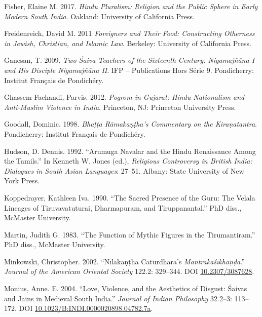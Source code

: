 \begin{hangparas}{0.125in}{1}
	\label{Fisher2017}Fisher, Elaine M. 2017. \emph{Hindu Pluralism: Religion and the Public Sphere in Early Modern South India}. Oakland: University of California Press.\medskip


	\label{Freidenreich2011}Freidenreich, David M. 2011 \emph{Foreigners and Their Food: Constructing Otherness in Jewish, Christian, and Islamic Law}. Berkeley: University of California Press.\medskip


	\label{Ganesan2009}Ganesan, T. 2009. \emph{Two Śaiva Teachers of the Sixteenth Century: Nigamajñāna I and His Disciple Nigamajñāna II}. IFP – Publications Hors Série 9. Pondicherry: Institut Français de Pondichéry. \medskip


	\label{GhassemFachandi2012}Ghassem-Fachandi, Parvis. 2012. \emph{Pogrom in Gujarat: Hindu Nationalism and Anti-Muslim Violence in India}. Princeton, NJ: Princeton University Press.\medskip


	\label{Goodall1998}Goodall, Dominic. 1998. \emph{Bhaṭṭa Rāmakaṇṭha’s Commentary on the Kiraṇatantra}. Pondicherry: Institut Français de Pondichéry.\medskip


	\label{Hudson1992}Hudson, D. Dennis. 1992. “Arumuga Navalar and the Hindu Renaissance Among the Tamils.” In Kenneth W. Jones (ed.), \emph{Religious Controversy in British India: Dialogues in South Asian Languages}: 27–51. Albany: State University of New York Press.\medskip


	\label{Koppedrayer1990}Koppedrayer, Kathleen Iva. 1990. “The Sacred Presence of the Guru: The Velala Lineages of Tiruvavatuturai, Dharmapuram, and Tiruppanantal.” PhD diss., McMaster University.\medskip


	\label{Martin1983}Martin, Judith G. 1983. “The Function of Mythic Figures in the Tirumantiram.” PhD diss., McMaster University.\medskip


	\label{Minkowski2002}Minkowski, Christopher. 2002. “Nīlakaṇṭha Caturdhara’s \emph{Mantrakāśīkhaṇḍa}.” \emph{Journal of the American Oriental Society} 122.2: 329–344. DOI \href{https://doi.org/10.2307/3087628}{10.2307/3087628}.\medskip


	\label{Monius2004}Monius, Anne. E. 2004. “Love, Violence, and the Aesthetics of Disgust: Śaivas and Jains in Medieval South India.” \emph{Journal of Indian Philosophy} 32.2–3: 113–172. DOI \href{https://doi.org/10.1023/B:INDI.0000020898.04782.7a}{10.1023/\allowbreak{}B:INDI\allowbreak{}.0000020898.04782.7a}.\medskip



\end{hangparas}
